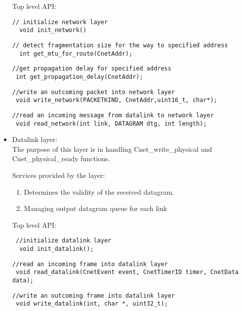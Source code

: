 \documentclass{article}
\begin{document}
\begin{itemize}
    Top level API:
		
   \begin{lstlisting}
// initialize network layer
  void init_network()	
\end{lstlisting} 
   
   		
   		\begin{lstlisting}
// detect fragmentation size for the way to specified address
  int get_mtu_for_route(CnetAddr);
\end{lstlisting}
	
	
	\begin{lstlisting}
//get propagation delay for specified address
 int get_propagation_delay(CnetAddr);
\end{lstlisting}
	

\begin{lstlisting}
//write an outcoming packet into network layer
 void write_network(PACKETKIND, CnetAddr,uint16_t, char*);
\end{lstlisting}
	

\begin{lstlisting}
//read an incoming message from datalink to network layer
 void read_network(int link, DATAGRAM dtg, int length);
\end{lstlisting}
	
    	    	
\item	Datalink layer: \\
		The purpose of this layer is in handling Cnet\_write\_physical and
		Cnet\_physical\_ready functions. 
		
		Services provided by the layer:
    \begin{enumerate}
      \item Determines the validity of the received datagram.
      \item Managing output datagram queue for each link 
    \end{enumerate}
		
		Top level API:

    
  \begin{lstlisting}
 //initialize datalink layer
  void init_datalink();
\end{lstlisting}
 
	\begin{lstlisting}
//read an incoming frame into datalink layer
 void read_datalink(CnetEvent event, CnetTimerID timer, CnetData data);
\end{lstlisting}
  

\begin{lstlisting}
//write an outcoming frame into datalink layer
 void write_datalink(int, char *, uint32_t);
\end{lstlisting} 
 


\end{itemize}
\end{document}
